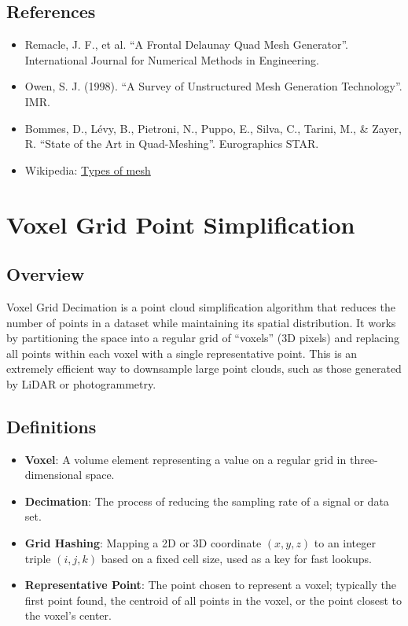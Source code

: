 \subsection{References}
\begin{itemize}
\item Remacle, J. F., et al. \cite{remacle2012} ``A Frontal Delaunay Quad Mesh Generator''. International Journal for Numerical Methods in Engineering.
\item Owen, S. J. (1998). ``A Survey of Unstructured Mesh Generation Technology''. IMR.
\item Bommes, D., L\'evy, B., Pietroni, N., Puppo, E., Silva, C., Tarini, M., \& Zayer, R. \cite{bommes2013} ``State of the Art in Quad-Meshing''. Eurographics STAR.
\item Wikipedia: \href{https://en.wikipedia.org/wiki/Types_of_mesh\#Quadrilateral}{Types of mesh}
\end{itemize}

\section{Voxel Grid Point Simplification}
\label{sec:voxel_grid_decimation}

\subsection{Overview}
Voxel Grid Decimation is a point cloud simplification algorithm that reduces the number of points in a dataset while maintaining its spatial distribution\cite{botsch2010}. It works by partitioning the space into a regular grid of ``voxels'' (3D pixels) and replacing all points within each voxel with a single representative point. This is an extremely efficient way to downsample large point clouds, such as those generated by LiDAR or photogrammetry.

\subsection{Definitions}
\begin{itemize}
\item \textbf{Voxel}: A volume element representing a value on a regular grid in three-dimensional space.
\item \textbf{Decimation}: The process of reducing the sampling rate of a signal or data set.
\item \textbf{Grid Hashing}: Mapping a 2D or 3D coordinate $(x, y, z)$ to an integer triple $(i, j, k)$ based on a fixed cell size, used as a key for fast lookups.
\item \textbf{Representative Point}: The point chosen to represent a voxel; typically the first point found, the centroid of all points in the voxel, or the point closest to the voxel's center.
\end{itemize}


